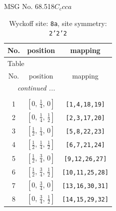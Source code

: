 \documentclass[fleqn,8pt]{jsarticle}
\begin{document}
\setcounter{MaxMatrixCols}{32}

\renewcommand{\tablename}{Table~}
\renewcommand{\figurename}{Figure~}
\begin{center}
\LARGE
MSG No. 68.518\quad$C_{c}cca$
\end{center}
\renewcommand{\arraystretch}{1.2}
\begin{longtable}{ccc}
\caption{Wyckoff site: {\tt 8a}, site symmetry: {\tt 2'2'2}}
 \\
 \hline \hline
No. & position & mapping \\ \hline \endfirsthead

\multicolumn{2}{l}{\tablename\ \thetable{}} \\
 \hline \hline
No. & position & mapping \\ \hline \endhead

 \hline \hline
\multicolumn{2}{r}{\footnotesize\it continued ...} \\ \endfoot

 \hline \hline
\multicolumn{2}{r}{} \\ \endlastfoot

1 & $\left[ 0,\, \frac{1}{4},\, 0 \right]$ & {\tt [1,4,18,19]} \\ \hline
2 & $\left[ 0,\, \frac{1}{4},\, \frac{1}{2} \right]$ & {\tt [2,3,17,20]} \\ \hline
3 & $\left[ \frac{1}{2},\, \frac{1}{4},\, 0 \right]$ & {\tt [5,8,22,23]} \\ \hline
4 & $\left[ \frac{1}{2},\, \frac{1}{4},\, \frac{1}{2} \right]$ & {\tt [6,7,21,24]} \\ \hline
5 & $\left[ \frac{1}{2},\, \frac{3}{4},\, 0 \right]$ & {\tt [9,12,26,27]} \\ \hline
6 & $\left[ \frac{1}{2},\, \frac{3}{4},\, \frac{1}{2} \right]$ & {\tt [10,11,25,28]} \\ \hline
7 & $\left[ 0,\, \frac{3}{4},\, 0 \right]$ & {\tt [13,16,30,31]} \\ \hline
8 & $\left[ 0,\, \frac{3}{4},\, \frac{1}{2} \right]$ & {\tt [14,15,29,32]} \\
\end{longtable}
\renewcommand{\arraystretch}{1.2}
\end{document}
